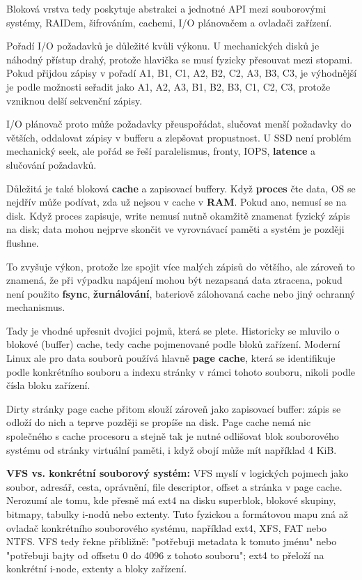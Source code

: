 \documentclass[11pt,a4paper]{article}
\newcommand{\itbox}[1]{\medskip\noindent\colorbox{black!6}{\parbox{\dimexpr\linewidth-2\fboxsep}{#1}}\medskip}
\begin{document}
Bloková vrstva tedy poskytuje abstrakci a jednotné API mezi souborovými systémy, RAIDem, šifrováním, cachemi, I/O plánovačem a ovladači zařízení.

Pořadí I/O požadavků je důležité kvůli výkonu. U mechanických disků je náhodný přístup drahý, protože hlavička se musí fyzicky přesouvat mezi stopami. Pokud přijdou zápisy v pořadí A1, B1, C1, A2, B2, C2, A3, B3, C3, je výhodnější je podle možnosti seřadit jako A1, A2, A3, B1, B2, B3, C1, C2, C3, protože vzniknou delší sekvenční zápisy.

I/O plánovač proto může požadavky přeuspořádat, slučovat menší požadavky do větších, oddalovat zápisy v bufferu a zlepšovat propustnost. U SSD není problém mechanický seek, ale pořád se řeší paralelismus, fronty, IOPS, \textbf{latence} a slučování požadavků.

Důležitá je také bloková \textbf{cache} a zapisovací buffery. Když \textbf{proces} čte data, OS se nejdřív může podívat, zda už nejsou v cache v \textbf{RAM}. Pokud ano, nemusí se na disk. Když proces zapisuje, write nemusí nutně okamžitě znamenat fyzický zápis na disk; data mohou nejprve skončit ve vyrovnávací paměti a systém je později flushne.

To zvyšuje výkon, protože lze spojit více malých zápisů do většího, ale zároveň to znamená, že při výpadku napájení mohou být nezapsaná data ztracena, pokud není použito \textbf{fsync}, \textbf{žurnálování}, bateriově zálohovaná cache nebo jiný ochranný mechanismus.

Tady je vhodné upřesnit dvojici pojmů, která se plete. Historicky se mluvilo o blokové (buffer) cache, tedy cache pojmenované podle bloků zařízení. Moderní Linux ale pro data souborů používá hlavně \textbf{page cache}, která se identifikuje podle konkrétního souboru a indexu stránky v rámci tohoto souboru, nikoli podle čísla bloku zařízení.

Dirty stránky page cache přitom slouží zároveň jako zapisovací buffer: zápis se odloží do nich a teprve později se propíše na disk. Page cache nemá nic společného s cache procesoru a stejně tak je nutné odlišovat blok souborového systému od stránky virtuální paměti, i když obojí může mít například 4 KiB.

\itbox{\textbf{VFS vs. konkrétní souborový systém:} VFS myslí v logických pojmech jako soubor, adresář, cesta, oprávnění, file descriptor, offset a stránka v page cache. Nerozumí ale tomu, kde přesně má ext4 na disku superblok, blokové skupiny, bitmapy, tabulky i-nodů nebo extenty. Tuto fyzickou a formátovou mapu zná až ovladač konkrétního souborového systému, například ext4, XFS, FAT nebo NTFS. VFS tedy řekne přibližně: "potřebuji metadata k tomuto jménu" nebo "potřebuji bajty od offsetu 0 do 4096 z tohoto souboru"; ext4 to přeloží na konkrétní i-node, extenty a bloky zařízení.}
\end{document}
